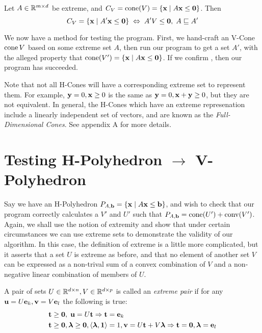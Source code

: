 \begin{EqCriteria}\label{eq_vc_hc}
	Let $A\in\mathbb{R}^{m\times d}$ be extreme, and $C_V = \operatorname{cone}(V) = \left\{\mathbf{x}\;|\; A\mathbf{x}\leq\mathbf{0}\right\}$.  Then
	\[ C_V = \left\{\mathbf{x}\;|\; A'\mathbf{x}\leq\mathbf{0}\right\} \;\Leftrightarrow\; A'V\leq\mathbf{0},\; A \sqsubseteq A' \]
\end{EqCriteria}

\begin{Test}\label{test_vc_to_hc}
	We now have a method for testing the program.  First, we hand-craft an V-Cone $\operatorname{cone}{V}$ based on some extreme set $A$, then run our program to get a set $A'$, with the alleged property that $\operatorname{cone}(V') = \left\{\mathbf{x}\;|\; A\mathbf{x}\leq\mathbf{0}\right\}$.  If we confirm , then our program has succeeded.
\end{Test}

\begin{Remark}\label{pointed_vcones}
  Note that not all H-Cones will have a corresponding extreme set to represent them.  For example, $\mathbf{y} = 0, \mathbf{x} \geq 0$ is the same as $\mathbf{y} = 0, \mathbf{x} + \mathbf{y} \geq 0$, but they are not equivalent.  In general, the H-Cones which have an extreme represenation include a linearly independent set of vectors, and are known as the \textit{Full-Dimensional Cones}.  See appendix A for more details.
\end{Remark}

\section{Testing H-Polyhedron $\to$ V-Polyhedron}

Say we have an H-Polyhedron $P_{A,\mathbf{b}} = \left\{\mathbf{x}\;|\; A\mathbf{x}\leq \mathbf{b}\right\}$, and wish to check that our program correctly calculates a $V'$ and $U'$ such that $P_{A,\mathbf{b}} = \operatorname{cone}(U') + \operatorname{conv}(V')$.  Again, we shall use the notion of extremity and show that under certain circumstances we can use extreme sets to demonstrate the validity of our algorithm.  In this case, the definition of extreme is a little more complicated, but it asserts that a set $U$ is extreme as before, and that no element of another set $V$ can be expressed as a non-trival sum of a convex combination of $V$ and a non-negative linear combination of members of $U$.

\begin{Def}{ A pair of sets $U\in\mathbb{R}^{d\times n}, V\in\mathbb{R}^{d\times p}$ is called an \textit{extreme pair} if for any $\mathbf{u} = U\mathbf{e}_k, \mathbf{v} = V\mathbf{e}_l$ the following is true:
		\begin{alignat*}{1}
			 & \mathbf{t} \geq \mathbf{0},\; \mathbf{u} = U\mathbf{t} \Rightarrow \mathbf{t} = \mathbf{e}_k                              \\
			 & \mathbf{t} \geq \mathbf{0}, \bm{\lambda} \geq \mathbf{0}, \left\langle \bm{\lambda}, \mathbf{1} \right\rangle = 1, \mathbf{v} = U\mathbf{t} + V\bm{\lambda}
			\Rightarrow \mathbf{t} = \mathbf{0}, \bm{\lambda} = \mathbf{e}_l
		\end{alignat*}
	}\end{Def}

